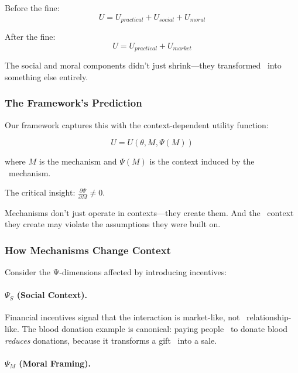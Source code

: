 Before the fine:
\begin{equation}
U = U_{practical} + U_{social} + U_{moral}
\end{equation}

After the fine:
\begin{equation}
U = U_{practical} + U_{market}
\end{equation}

The social and moral components didn't just shrink---they transformed \
into something else entirely.

\subsubsection{The Framework's Prediction}

Our framework captures this with the context-dependent utility function:

\begin{equation}
U = U(\theta, M, \Psi(M))
\end{equation}

where $M$ is the mechanism and $\Psi(M)$ is the context induced by the \
mechanism.

The critical insight: $\frac{\partial \Psi}{\partial M} \neq 0$.

Mechanisms don't just operate in contexts---they create them. And the \
context they create may violate the assumptions they were built on.

\subsubsection{How Mechanisms Change Context}

Consider the Ψ-dimensions affected by introducing incentives:

\paragraph{$\Psi_S$ (Social Context).}

Financial incentives signal that the interaction is market-like, not \
relationship-like. The blood donation example is canonical: paying people \
to donate blood \emph{reduces} donations, because it transforms a gift \
into a sale.

\paragraph{$\Psi_M$ (Moral Framing).}

